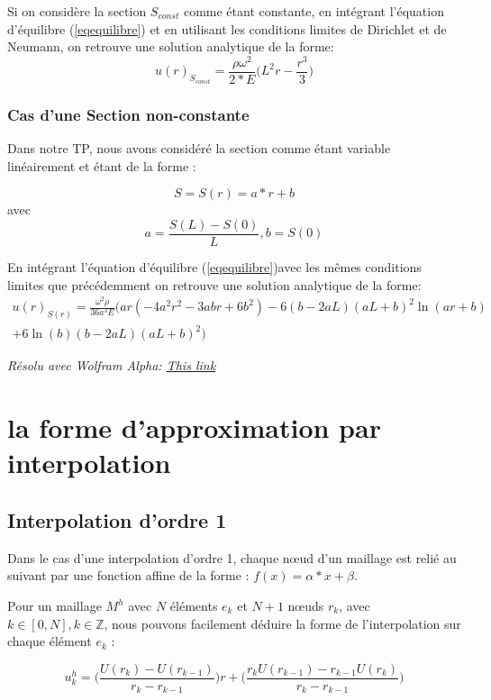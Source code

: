 \documentclass[a4paper,10pt]{report} %
\begin{document}
Si on considère la section $S_{const}$ comme étant constante, en intégrant l'équation d'équilibre (\ref{eqequilibre}) et en utilisant les conditions limites de Dirichlet et de Neumann, on retrouve une solution analytique de la forme:
\begin{equation}
	u(r)_{S_{const}}=\frac{\rho \omega^2}{2*E}\big(L^2 r-\frac{r^3}{3}\big)
	\label{solsconst}
\end{equation}

\subsubsection{Cas d'une Section non-constante}

Dans notre TP, nous avons considéré la section comme étant variable linéairement et étant de la forme :

$$S=S(r)=a*r+b$$
avec
$$a=\frac{S(L)-S(0)}{L},b=S(0)$$ 

En intégrant l'équation d'équilibre (\ref{eqequilibre})avec les mêmes conditions limites que précédemment on retrouve une solution analytique de la forme:
\begin{multline}
	u(r)_{S(r)}=\frac{\omega^2 \rho}{36a^3E}\Big( ar(-4a^2r^2-3abr+6b^2)-6(b-2aL)(aL+b)^2\ln(ar+b)\\+6\ln(b)(b-2aL)(aL+b)^2 \Big)
	\label{solution u}
\end{multline}

\textit{Résolu avec Wolfram Alpha\textregistered : \href{https://goo.gl/IB3dHC}{This link}}

\section{la forme d'approximation par interpolation}

\subsection{Interpolation d'ordre 1}

Dans le cas d'une interpolation d'ordre 1, chaque nœud d'un maillage est relié au suivant par une fonction affine de la forme : $f(x)=\alpha*x+\beta$.

Pour un maillage $M^h$ avec $N$ éléments $e_{k}$ et $N+1$ nœuds $r_{k}$, avec $k\in [0,N],k\in\mathbb{Z}$, nous pouvons facilement déduire la forme de l'interpolation sur chaque élément $e_{k}$ :

\begin{equation}
	u^h_{k}=\Big(\frac{U(r_{k})-U(r_{k-1})}{r_{k}-r_{k-1}}\Big)r+(\frac{r_{k}U(r_{k-1})-r_{k-1}U(r_{k})}{r_{k}-r_{k-1}}\Big)
	\label{interpolationP1}
\end{equation}
\end{document}
